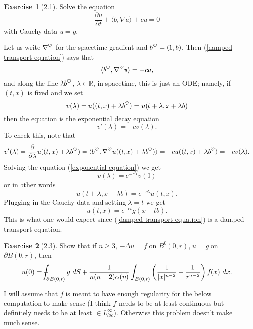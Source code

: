 \documentclass[10pt]{article}
\newcommand{\RR}{\mathbb{R}}
\newcommand{\heart}{\ensuremath\heartsuit}
\def\Xint#1{\mathchoice
{\XXint\displaystyle\textstyle{#1}}%
{\XXint\textstyle\scriptstyle{#1}}%
{\XXint\scriptstyle\scriptscriptstyle{#1}}%
{\XXint\scriptscriptstyle\scriptscriptstyle{#1}}%
\!\int}
\def\XXint#1#2#3{{\setbox0=\hbox{$#1{#2#3}{\int}$ }
\vcenter{\hbox{$#2#3$ }}\kern-.6\wd0}}
\def\dashint{\Xint-}
\theoremstyle{definition}
\newtheorem{exer}{Exercise}
\begin{document}
\begin{exer}[2.1]
Solve the equation
\begin{equation}
\label{damped transport equation}
\frac{\partial u}{\partial t} + \langle b, \nabla u\rangle + cu = 0
\end{equation}
with Cauchy data $u = g$.
\end{exer}

Let us write $\nabla^\heart$ for the spacetime gradient and $b^\heart = (1, b)$. Then (\ref{damped transport equation}) says that
$$\langle b^\heart, \nabla^\heart u\rangle = -cu,$$
and along the line $\lambda b^\heart$, $\lambda \in \RR$, in spacetime, this is just an ODE; namely, if $(t, x)$ is fixed and we set
$$v(\lambda) = u((t, x) + \lambda b^\heart) = u(t + \lambda, x + \lambda b)$$
then the equation is the exponential decay equation
\begin{equation}
\label{exponential equation}
v'(\lambda) = -cv(\lambda).
\end{equation}
To check this, note that
$$v'(\lambda) = \frac{\partial}{\partial \lambda} u((t, x) + \lambda b^\heart) = \langle b^\heart, \nabla^\heart u((t,x) + \lambda b^\heart)\rangle = -cu((t,x) + \lambda b^\heart) = -cv(\lambda).$$
Solving the equation (\ref{exponential equation}) we get
$$v(\lambda) = e^{-c\lambda}v(0)$$
or in other words
$$u(t + \lambda, x + \lambda b) = e^{-c\lambda} u(t, x).$$
Plugging in the Cauchy data and setting $\lambda = t$ we get
$$u(t, x) = e^{-ct} g(x - tb).$$
This is what one would expect since (\ref{damped transport equation}) is a damped transport equation.

\begin{exer}[2.3]
Show that if $n \geq 3$, $-\Delta u = f$ on $B^0(0, r)$, $u = g$ on $\partial B(0, r)$, then
$$u(0) = \dashint_{\partial B(0, r)} g ~dS + \frac{1}{n(n-2)\alpha(n)} \int_{B(0,r)} \left(\frac{1}{|x|^{n-2}} - \frac{1}{r^{n-2}}\right) f(x)~dx.$$
\end{exer}

I will assume that $f$ is meant to have enough regularity for the below computation to make sense (I think $f$ needs to be at least continuous but definitely needs to be at least $\in L^\infty_{loc}$). Otherwise this problem doesn't make much sense.
\end{document}
